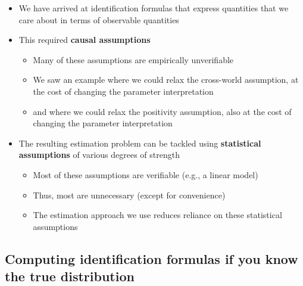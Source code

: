 \documentclass[
  12pt,
]{book}
\providecommand{\tightlist}{%
  \setlength{\itemsep}{0pt}\setlength{\parskip}{0pt}}
\theoremstyle{definition}
\theoremstyle{definition}
\theoremstyle{definition}
\newcommand{\1}{\mathbbm{1}}
\begin{document}
\begin{itemize}
\tightlist
\item
  We have arrived at identification formulas that express quantities that we
  care about in terms of observable quantities
\item
  This required \textbf{causal assumptions}

  \begin{itemize}
  \tightlist
  \item
    Many of these assumptions are empirically unverifiable
  \item
    We saw an example where we could relax the cross-world assumption, at the
    cost of changing the parameter interpretation
  \item
    and where we could relax the positivity assumption, also at the cost of
    changing the parameter interpretation
  \end{itemize}
\item
  The resulting estimation problem can be tackled using \textbf{statistical
  assumptions} of various degrees of strength

  \begin{itemize}
  \tightlist
  \item
    Most of these assumptions are verifiable (e.g., a linear model)
  \item
    Thus, most are unnecessary (except for convenience)
  \item
    The estimation approach we use reduces reliance on these statistical
    assumptions
  \end{itemize}
\end{itemize}

\hypertarget{computing-identification-formulas-if-you-know-the-true-distribution}{%
\subsection{Computing identification formulas if you know the true distribution}\label{computing-identification-formulas-if-you-know-the-true-distribution}}
\end{document}
